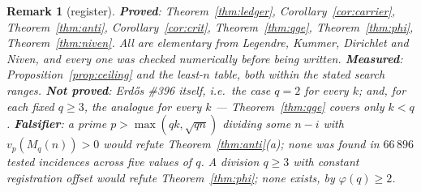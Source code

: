\documentclass[11pt]{article}
\newtheorem{remark}[theorem]{Remark}
\begin{document}
\begin{remark}[register]
\textbf{Proved}: Theorem~\ref{thm:ledger}, Corollary~\ref{cor:carrier},
Theorem~\ref{thm:anti}, Corollary~\ref{cor:crit}, Theorem~\ref{thm:qge},
Theorem~\ref{thm:phi}, Theorem~\ref{thm:niven}.  All are elementary from Legendre, Kummer,
Dirichlet and Niven, and every one was checked numerically before being written.
\textbf{Measured}: Proposition~\ref{prop:ceiling} and the least-$n$ table, both within the
stated search ranges.
\textbf{Not proved}: Erd\H{o}s \#396 itself, i.e.\ the case $q=2$ for every $k$; and, for each
fixed $q\ge3$, the analogue for every $k$ --- Theorem~\ref{thm:qge} covers only $k<q$.
\textbf{Falsifier}: a prime $p>\max(qk,\sqrt{qn})$ dividing some $n-i$ with
$v_p(M_q(n))>0$ would refute Theorem~\ref{thm:anti}(a); none was found in $66\,896$ tested
incidences across five values of $q$.  A division $q\ge3$ with constant registration offset
would refute Theorem~\ref{thm:phi}; none exists, by $\varphi(q)\ge2$.
\end{remark}
\end{document}
